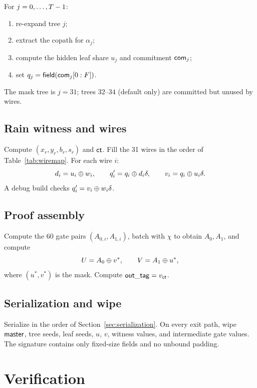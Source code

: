 \documentclass[11pt,a4paper]{article}
\begin{document}
For $j=0,\ldots,T-1$:
\begin{enumerate}
  \item re-expand tree $j$;
  \item extract the copath for $\alpha_j$;
  \item compute the hidden leaf share $u_j$ and commitment $\mathsf{com}_j$;
  \item set $q_j=\mathsf{field}(\mathsf{com}_j[0:F])$.
\end{enumerate}
The mask tree is $j=31$; trees $32$--$34$ (default only) are committed but
unused by wires.

\subsection{Rain witness and wires}

Compute $(x_r,y_r,b_r,s_r)$ and $\mathsf{ct}$. Fill the 31 wires in the order of
Table~\ref{tab:wiremap}. For each wire $i$:
\[
d_i=u_i\oplus w_i,\qquad
q_i'=q_i\oplus d_i\delta,\qquad
v_i=q_i\oplus u_i\delta.
\]
A debug build checks $q_i'=v_i\oplus w_i\delta$.

\subsection{Proof assembly}

Compute the 60 gate pairs $(A_{0,i},A_{1,i})$, batch with $\chi$ to obtain
$A_0,A_1$, and compute
\[
U=A_0\oplus v^\ast,\qquad V=A_1\oplus u^\ast,
\]
where $(u^\ast,v^\ast)$ is the mask. Compute $\mathsf{out\_tag}=v_{\mathsf{ct}}$.

\subsection{Serialization and wipe}

Serialize in the order of Section~\ref{sec:serialization}. On every exit
path, wipe $\mathsf{master}$, tree seeds, leaf seeds, $u$, $v$, witness values, and
intermediate gate values. The signature contains only fixed-size fields and
no unbound padding.

\section{Verification}
\end{document}
